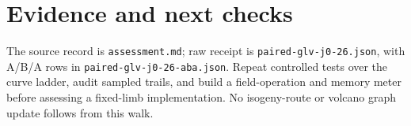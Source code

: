 \documentclass[11pt]{article}
\begin{document}
\section*{Evidence and next checks}
The source record is \texttt{assessment.md}; raw receipt is
\texttt{paired-glv-j0-26.json}, with A/B/A rows in
\texttt{paired-glv-j0-26-aba.json}. Repeat controlled tests over the curve
ladder, audit sampled trails, and build a field-operation and memory meter
before assessing a fixed-limb implementation. No
isogeny-route or volcano graph update follows from this walk.
\end{document}
